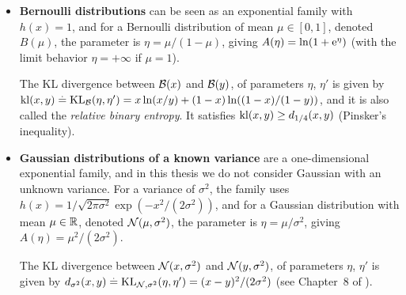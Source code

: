 \label{par:2:notationsExponentialFamiliesBernoulliGaussian}
\begin{itemize}
    \item
    \textbf{Bernoulli distributions} can be seen as an exponential family with $h(x) = 1$,
    and for a Bernoulli distribution of mean $\mu\in[0,1]$, denoted $B(\mu)$,
    the parameter is $\eta = \mu / (1 - \mu)$, giving $A(\eta) = \ln(1 + \mathrm{e}^{\eta})$
    (with the limit behavior $\eta=+\infty$ if $\mu=1$).

    The KL divergence between $\mathcal{B}(x)$ and $\mathcal{B}(y)$, of parameters $\eta$, $\eta'$ is given by
    $\mathrm{kl}(x,y) \overset{.}{=} \mathrm{KL}_{\mathcal{B}}(\eta,\eta') = x \ln(x/y) + (1-x) \ln((1-x)/(1-y))$,
    and it is also called the \emph{relative binary entropy}.
    It satisfies $\mathrm{kl}(x,y) \geq d_{1/4}(x,y)$ (Pinsker's inequality).

    \item
    \textbf{Gaussian distributions of a known variance} are a one-dimensional exponential family,
    and in this thesis we do not consider Gaussian with an unknown variance.
    For a variance of $\sigma^2$, the family uses
    $h(x) = 1/\sqrt{2\pi\sigma^2} \exp(-x^2/(2\sigma^2))$,
    and for a Gaussian distribution with mean $\mu\in\mathbb{R}$, denoted $\mathcal{N}(\mu,\sigma^2)$,
    the parameter is $\eta = \mu/\sigma^2$, giving $A(\eta) = \mu^2/(2\sigma^2)$.

    The KL divergence between $\mathcal{N}(x,\sigma^2)$ and $\mathcal{N}(y,\sigma^2)$, of parameters $\eta$, $\eta'$ is given by
    $d_{\sigma^2}(x,y) \overset{.}{=} \mathrm{KL}_{\mathcal{N},\sigma^2}(\eta,\eta') = (x-y)^2 / (2\sigma^2)$
    (see Chapter~8 of \cite{JordanCourseStatBerkeley}).
\end{itemize}


